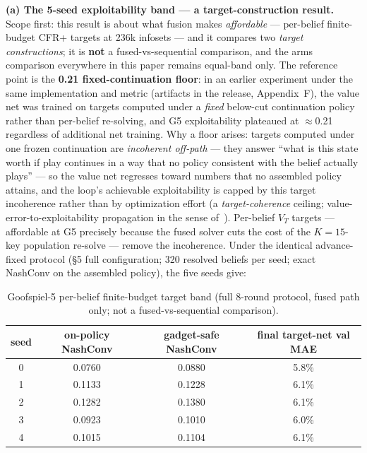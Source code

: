 \documentclass[11pt]{article}
\begin{document}
\textbf{(a) The 5-seed exploitability band --- a target-construction result.} Scope
first: this result is about what fusion makes \emph{affordable} --- per-belief
finite-budget CFR+ targets at 236k infosets --- and it compares two \emph{target
constructions}; it is \textbf{not} a fused-vs-sequential comparison, and the arms
comparison everywhere in this paper remains equal-band only. The reference point is the
\textbf{0.21 fixed-continuation floor}: in an earlier experiment under the same
implementation and metric (artifacts in the release, Appendix~F), the value net was
trained on targets computed under a \emph{fixed} below-cut continuation policy rather
than per-belief re-solving, and G5 exploitability plateaued at $\approx$0.21 regardless
of additional net training. Why a floor arises: targets computed under one frozen
continuation are \emph{incoherent off-path} --- they answer ``what is this state worth
if play continues in a way that no policy consistent with the belief actually plays''
--- so the value net regresses toward numbers that no assembled policy attains, and the
loop's achievable exploitability is capped by this target incoherence rather than by
optimization effort (a \emph{target-coherence} ceiling; value-error-to-exploitability
propagation in the sense of~\citep{KovarikLisy2019}). Per-belief $V_T$ targets ---
affordable at G5 precisely because the fused solver cuts the cost of the $K{=}15$-key
population re-solve --- remove the incoherence. Under the identical advance-fixed
protocol (\S5 full configuration; 320 resolved beliefs per seed; exact NashConv on the
assembled policy), the five seeds give:

\begin{table}[t]
\centering
\caption{Goofspiel-5 per-belief finite-budget target band (full 8-round protocol,
fused path only; not a fused-vs-sequential comparison).}
\label{tab:g5band}
\begin{tabular}{cccc}
\toprule
seed & on-policy NashConv & gadget-safe NashConv & final target-net val MAE \\
\midrule
0 & 0.0760 & 0.0880 & 5.8\% \\
1 & 0.1133 & 0.1228 & 6.1\% \\
2 & 0.1282 & 0.1380 & 6.1\% \\
3 & 0.0923 & 0.1010 & 6.0\% \\
4 & 0.1015 & 0.1104 & 6.1\% \\
\bottomrule
\end{tabular}
\end{table}
\end{document}
